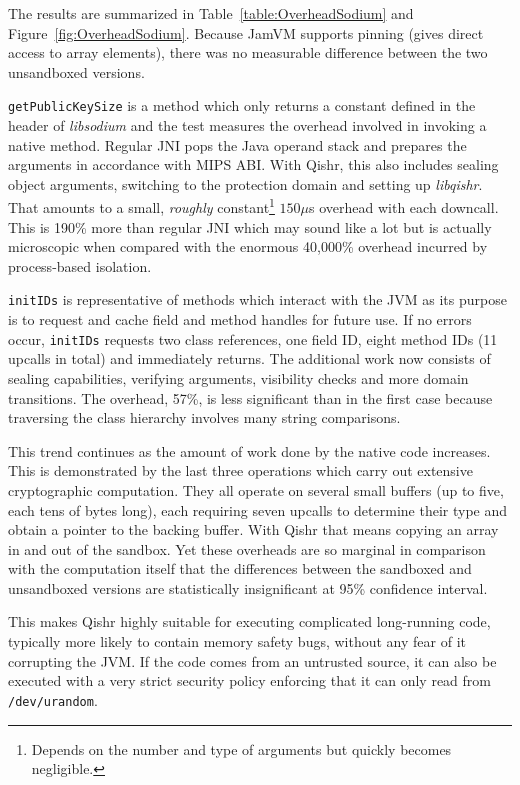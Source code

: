 \documentclass[a4paper,12pt,twoside,openright]{report}
\newcommand{\tool}[1]{\emph{#1}}
\newcommand{\lib}[1]{\tool{lib#1}}
\begin{document}
The results are summarized in Table~\ref{table:OverheadSodium} and Figure~\ref{fig:OverheadSodium}. Because JamVM supports pinning (gives direct access to array elements), there was no measurable difference between the two unsandboxed versions. 

\texttt{getPublicKeySize} is a method which only returns a constant defined in the header of \lib{sodium} and the test measures the overhead involved in invoking a native method. Regular JNI pops the Java operand stack and prepares the arguments in accordance with MIPS ABI. With Qishr, this also includes sealing object arguments, switching to the protection domain and setting up \lib{qishr}. That amounts to a small, \emph{roughly} constant\footnote{Depends on the number and type of arguments but quickly becomes negligible.} $150 \mu$s overhead with each downcall. This is 190\% more than regular JNI which may sound like a lot but is actually microscopic when compared with the enormous 40,000\% overhead incurred by process-based isolation. 

\texttt{initIDs} is representative of methods which interact with the JVM as its purpose is to request and cache field and method handles for future use. If no errors occur, \texttt{initIDs} requests two class references, one field ID, eight method IDs (11 upcalls in total) and immediately returns. The additional work now consists of sealing capabilities, verifying arguments, visibility checks and more domain transitions. The overhead, 57\%, is less significant than in the first case because traversing the class hierarchy involves many string comparisons. 

This trend continues as the amount of work done by the native code increases. This is demonstrated by the last three operations which carry out extensive cryptographic computation. They all operate on several small buffers (up to five, each tens of bytes long), each requiring seven upcalls to determine their type and obtain a pointer to the backing buffer. With Qishr that means copying an array in and out of the sandbox. Yet these overheads are so marginal in comparison with the computation itself that the differences between the sandboxed and unsandboxed versions are statistically insignificant at 95\% confidence interval.

This makes Qishr highly suitable for executing complicated long-running code, typically more likely to contain memory safety bugs, without any fear of it corrupting the JVM. If the code comes from an untrusted source, it can also be executed with a very strict security policy enforcing that it can only read from \texttt{/dev/urandom}.
\end{document}
